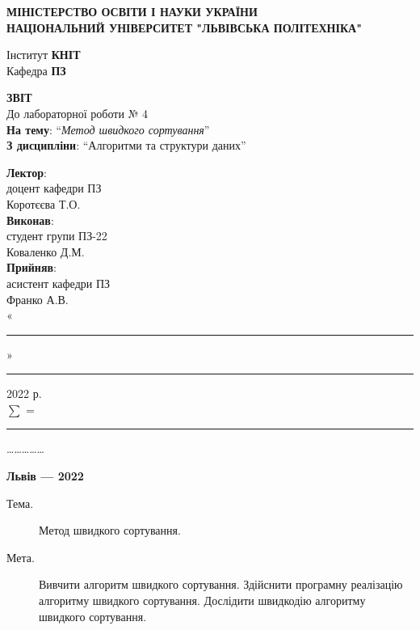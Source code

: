 \documentclass{article}
\newcommand\subject{Алгоритми та структури даних}
\newcommand\lecturer{доцент кафедри ПЗ\\Коротєєва Т.О.}
\newcommand\teacher{асистент кафедри ПЗ\\Франко А.В.}
\newcommand\mygroup{ПЗ-22}
\newcommand\lab{4}
\newcommand\theme{Метод швидкого сортування}
\newcommand\purpose{Вивчити алгоритм швидкого сортування. Здійснити програмну реалізацію алгоритму швидкого сортування. Дослідити швидкодію алгоритму швидкого сортування}
\begin{document}
	\begin{normalsize}
		\begin{titlepage}
			\thispagestyle{empty}
			\begin{center}
				\textbf{МІНІСТЕРСТВО ОСВІТИ І НАУКИ УКРАЇНИ\\
					НАЦІОНАЛЬНИЙ УНІВЕРСИТЕТ "ЛЬВІВСЬКА ПОЛІТЕХНІКА"}
			\end{center}
			\begin{flushright}
				Інститут \textbf{КНІТ}\\
				Кафедра \textbf{ПЗ}
			\end{flushright}
			\vspace{200pt}
			\begin{center}
				\textbf{ЗВІТ}\\
				\vspace{10pt}
				До лабораторної роботи № \lab\\
				\textbf{На тему}: “\textit{\theme}”\\
				\textbf{З дисципліни}: “\subject”
			\end{center}
			\vspace{112pt}
			\begin{flushright}
				
				\textbf{Лектор}:\\
				\lecturer\\
				\vspace{28pt}
				\textbf{Виконав}:\\
				
				студент групи \mygroup\\
				Коваленко Д.М.\\
				\vspace{28pt}
				\textbf{Прийняв}:\\
				
				\teacher\\
				
				\vspace{28pt}
				«\rule{1cm}{0.15mm}» \rule{1.5cm}{0.15mm} 2022 р.\\
				$\sum$ = \rule{1cm}{0.15mm}……………\\
				
			\end{flushright}
			\vspace{\fill}
			\begin{center}
				\textbf{Львів — 2022}
			\end{center}
		\end{titlepage}
		
		\begin{description}
			\item[Тема.] \theme.
			\item[Мета.] \purpose.
		\end{description}
		

\end{normalsize}
\end{document}
